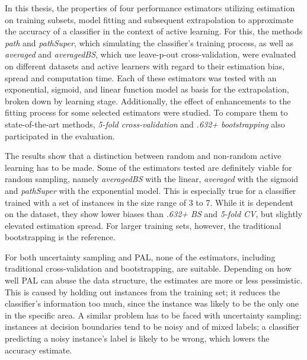 \label{conclusion}

In this thesis, the properties of four performance estimators utilizing estimation on training subsets, model fitting and subsequent extrapolation to approximate the accuracy of a classifier in the context of active learning. For this, the methods \textit{path} and \textit{pathSuper}, which simulating the classifier's training process, as well as \textit{averaged} and \textit{averagedBS}, which use leave-p-out cross-validation, were evaluated on different datasets and active learners with regard to their estimation bias, spread and computation time. Each of these estimators was tested with an exponential, sigmoid, and linear function model as basis for the extrapolation, broken down by learning stage. Additionally, the effect of enhancements to the fitting process for some selected estimators were studied. To compare them to state-of-the-art methods, \textit{5-fold cross-validation} and \textit{.632+ bootstrapping} also participated in the evaluation.

The results show that a distinction between random and non-random active learning has to be made. Some of the estimators tested are definitely viable for random sampling, namely \textit{averagedBS} with the linear, \textit{averaged} with the sigmoid and \textit{pathSuper} with the exponential model. This is especially true for a classifier trained with a set of instances in the size range of 3 to 7. While it is dependent on the dataset, they show lower biases than \textit{.632+ BS} and \textit{5-fold CV}, but slightly elevated estimation spread. For larger training sets, however, the traditional bootstrapping is the reference.

For both uncertainty sampling and PAL, none of the estimators, including traditional cross-validation and bootstrapping, are suitable. Depending on how well PAL can abuse the data structure, the estimates are more or less pessimistic. This is caused by holding out instances from the training set; it reduces the classifier's information too much, since the instance was likely to be the only one in the specific area. A similar problem has to be faced with uncertainty sampling: instances at decision boundaries tend to be noisy and of mixed labels; a classifier predicting a noisy instance's label is likely to be wrong, which lowers the accuracy estimate.

